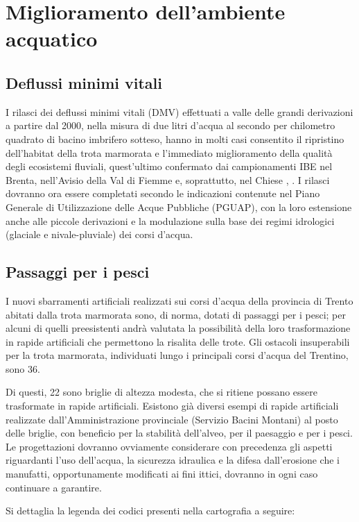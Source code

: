 \documentclass[10pt,twoside,openany,x11names,svgnames,italian,a5paper,dvipsnames,table]{memoir}
\begin{document}
\section{Miglioramento dell'ambiente acquatico}

\subsection{Deflussi minimi vitali}
I rilasci dei deflussi minimi vitali (DMV) effettuati a valle delle grandi derivazioni a partire dal 2000, nella misura di due litri d’acqua al secondo per chilometro quadrato di bacino imbrifero sotteso, hanno in molti casi consentito il ripristino dell’habitat della trota marmorata e l’immediato miglioramento della qualità degli ecosistemi fluviali, quest’ultimo confermato dai campionamenti IBE nel Brenta, nell’Avisio della Val di Fiemme e, soprattutto, nel Chiese \cite{PAT01}, \cite{PAT07}. 
I rilasci dovranno ora essere completati secondo le indicazioni contenute nel Piano Generale di Utilizzazione delle Acque Pubbliche (PGUAP), con la loro estensione anche alle piccole derivazioni e la modulazione sulla base dei regimi idrologici (glaciale e nivale-pluviale) dei corsi d’acqua.


\subsection{Passaggi per i pesci}
I nuovi sbarramenti artificiali realizzati sui corsi d’acqua della provincia di Trento abitati dalla trota marmorata sono, di norma, dotati di passaggi per i pesci; per alcuni di quelli preesistenti andrà valutata la possibilità della loro trasformazione in rapide artificiali che permettono la risalita delle trote. Gli ostacoli insuperabili per la trota marmorata, individuati lungo i principali corsi d’acqua del Trentino, sono 36. 

Di questi, 22 sono briglie di altezza modesta, che si ritiene possano essere trasformate in rapide artificiali.
Esistono già diversi esempi di rapide artificiali realizzate dall’Amministrazione provinciale (Servizio Bacini Montani) al posto delle briglie, con beneficio per la stabilità dell’alveo, per il paesaggio e per i pesci. Le progettazioni dovranno ovviamente considerare con precedenza gli aspetti riguardanti l’uso dell’acqua, la sicurezza idraulica e la difesa dall’erosione che i manufatti, opportunamente modificati ai fini ittici, dovranno in ogni caso continuare a garantire.

Si dettaglia la legenda dei codici presenti nella cartografia a seguire:
\end{document}

